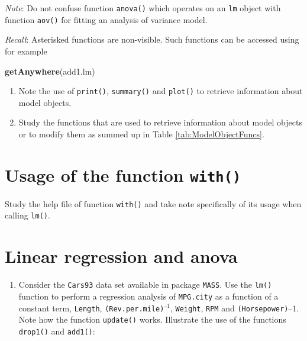 \documentclass[
]{book}
\newenvironment{Shaded}{\begin{snugshade}}{\end{snugshade}}
\newcommand{\FunctionTok}[1]{\textcolor[rgb]{0.13,0.29,0.53}{\textbf{#1}}}
\newcommand{\NormalTok}[1]{#1}
\providecommand{\tightlist}{%
  \setlength{\itemsep}{0pt}\setlength{\parskip}{0pt}}
\begin{document}
\emph{Note}: Do not confuse function \texttt{anova()} which operates on an \texttt{lm} object with function \texttt{aov()} for fitting an analysis of variance model.

\emph{Recall}: Asterisked functions are non-visible. Such functions can be accessed using for example

\begin{Shaded}
\begin{Highlighting}[]
\FunctionTok{getAnywhere}\NormalTok{(add1.lm)}
\end{Highlighting}
\end{Shaded}

\begin{enumerate}
\def\labelenumi{(\alph{enumi})}
\item
  Note the use of \texttt{print()}, \texttt{summary()} and \texttt{plot()} to retrieve information about model objects.
\item
  Study the functions that are used to retrieve information about model objects or to modify them as summed up in Table \ref{tab:ModelObjectFuncs}.
\end{enumerate}

\section{\texorpdfstring{Usage of the function \texttt{with()}}{Usage of the function with()}}\label{usage-of-the-function-with}

Study the help file of function \texttt{with()} and take note specifically of its usage when calling \texttt{lm()}.

\section{Linear regression and anova}\label{lmAnova}

\begin{enumerate}
\def\labelenumi{(\alph{enumi})}
\tightlist
\item
  Consider the \texttt{Cars93} data set available in package \texttt{MASS}. Use the \texttt{lm()} function to perform a regression analysis of \texttt{MPG.city} as a function of a constant term, \texttt{Length}, \texttt{(Rev.per.mile)}\(^{–1}\), \texttt{Weight}, \texttt{RPM} and \texttt{(Horsepower)}\({–1}\). Note how the function \texttt{update()} works. Illustrate the use of the functions \texttt{drop1()} and \texttt{add1()}:
\end{enumerate}
\end{document}
